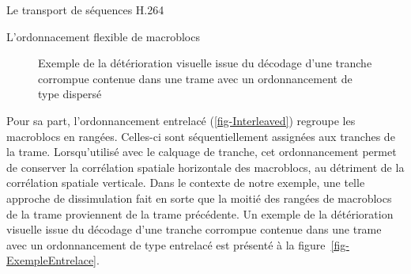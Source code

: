 \documentclass[letterpaper, twoside, 12pt,memoire]{thETS}
\newcommand{\fig}[1]{figure~\ref{#1}}
\providecommand{\DIFadd}[1]{{\protect\color{blue}\uwave{#1}}} %
\providecommand{\DIFaddFL}[1]{\DIFadd{#1}} %
\providecommand{\DIFaddbeginFL}{} %
\providecommand{\DIFaddendFL}{} %
\begin{document}
\begin{chapter}{Le transport de séquences H.264}
\begin{section}{L'ordonnacement flexible de macroblocs}
\begin{figure}[htb]
\caption{Exemple de la détérioration visuelle issue du décodage d'une tranche
corrompue contenue dans une trame avec un ordonnancement de type dispersé\DIFaddbeginFL \DIFaddFL{.}\DIFaddendFL }
\label{fig-ExempleDisperse}
\end{figure}

Pour sa part, l'ordonnancement entrelacé (\ref{fig-Interleaved}) regroupe les
macroblocs en rangées. Celles-ci sont séquentiellement assignées aux tranches de
la trame. Lorsqu'utilisé avec le calquage de tranche, cet ordonnancement permet
de conserver la corrélation spatiale horizontale des macroblocs, au détriment de
la corrélation spatiale verticale. Dans le contexte de notre exemple, une telle
approche de dissimulation fait en sorte que la moitié des rangées de
macroblocs de la trame proviennent de la trame précédente. Un exemple de la
détérioration visuelle issue du décodage d'une tranche corrompue contenue dans
une trame avec un ordonnancement de type entrelacé est présenté à la
\fig{fig-ExempleEntrelace}.


\end{section}
\end{chapter}
\end{document}
